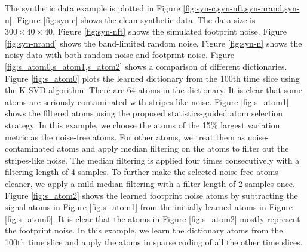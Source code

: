 The synthetic data example is plotted in Figure \ref{fig:syn-c,syn-nft,syn-nrand,syn-n}. Figure \ref{fig:syn-c} shows the clean synthetic data. The data size is $300\times 40\times 40$. Figure \ref{fig:syn-nft} shows the simulated footprint noise. Figure \ref{fig:syn-nrand} shows the band-limited random noise. Figure \ref{fig:syn-n} shows the noisy data with both random noise and footprint noise. Figure \ref{fig:s_atom0,s_atom1,s_atom2} shows a comparison of different dictionaries. Figure \ref{fig:s_atom0} plots the learned dictionary from the 100th time slice using the K-SVD algorithm. There are 64 atoms in the dictionary. It is clear that some atoms are seriously contaminated with stripes-like noise. Figure \ref{fig:s_atom1} shows the filtered atoms using the proposed statistics-guided atom selection strategy. In this example, we choose the atoms of the 15\% largest variation metric as the noise-free atoms. For other atoms, we treat them as noise-contaminated atoms and apply median filtering on the atoms to filter out the stripes-like noise. The median filtering is applied four times consecutively with a filtering length of 4 samples.  To further make the selected noise-free atoms cleaner, we apply a mild median filtering with a filter length of 2 samples once. Figure \ref{fig:s_atom2} shows the learned footprint noise atoms by subtracting the signal atoms in Figure \ref{fig:s_atom1} from the initially learned atoms in Figure \ref{fig:s_atom0}. It is clear that the atoms in Figure \ref{fig:s_atom2} mostly represent the footprint noise. In this example, we learn the dictionary atoms from the 100th time slice and apply the atoms in sparse coding of all the other time slices. 


